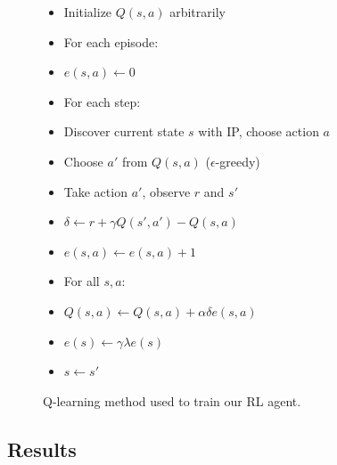 \documentclass{article}
\begin{document}
\begin{figure}[H]
    \centering
    \caption{Q-learning method used to train our RL agent.}
    \begin{itemize}
    \item[] Initialize $Q(s, a)$ arbitrarily
    \item[] For each episode:
    \item[] \hspace{2em} $e(s, a) \leftarrow 0$
    \item[] \hspace{2em} For each step:
    \item[] \hspace{4em} Discover current state $s$ with IP, choose action $a$
    \item[] \hspace{4em} Choose $a'$ from $Q(s, a)$ ($\epsilon$-greedy)
    \item[] \hspace{4em} Take action $a'$, observe $r$ and $s'$
    \item[] \hspace{4em} $\delta \leftarrow r + \gamma Q(s', a') - Q(s, a)$
    \item[] \hspace{4em} $e(s, a) \leftarrow e(s, a) + 1$
    \item[] \hspace{4em} For all $s, a$:
    \item[] \hspace{6em} $Q(s, a) \leftarrow Q(s, a) + \alpha \delta e(s, a)$
    \item[] \hspace{6em} $e(s) \leftarrow \gamma \lambda e(s)$
    \item[] \hspace{4em} $s \leftarrow s'$
  \end{itemize}
  \label{qlearn:code}
\end{figure}

\subsection{Results}
\end{document}
